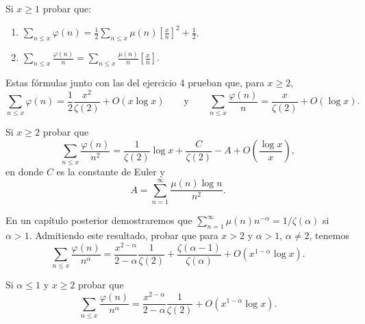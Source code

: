 \documentclass[12pt,a4paper]{book}
\begin{document}
    \begin{ejercicio}
        Si $x\geq1$ probar que:
        \begin{enumerate}
            \item[(a)] $\displaystyle\sum_{n\leq x}\varphi(n)
            =\frac{1}{2}\sum_{n\leq x}\mu(n)\left[\frac{x}{n}\right]^2+\frac{1}{2}$.
            \item[(b)] $\displaystyle\sum_{n\leq x}\frac{\varphi(n)}{n}
            =\sum_{n\leq x}\frac{\mu(n)}{n}\left[\frac{x}{n}\right]$.
        \end{enumerate}
        Estas fórmulas junto con las del ejercicio 4 prueban que, para $x\geq2$,
        \begin{equation*}
            \sum_{n\leq x}\varphi(n)=\frac{1}{2}\frac{x^2}{\zeta(2)}+O(x\log x)
            \qquad\text{y}\qquad
            \sum_{n\leq x}\frac{\varphi(n)}{n}=\frac{x}{\zeta(2)}+O(\log x).
        \end{equation*}
    \end{ejercicio}

    \begin{ejercicio}
        Si $x\geq2$ probar que
        \begin{equation*}
            \sum_{n\leq x}\frac{\varphi(n)}{n^2}=\frac{1}{\zeta(2)}\log x+\frac{C}{\zeta(2)}-A
            +O\left(\frac{\log x}{x}\right),
        \end{equation*}
        en donde $C$ es la constante de Euler y
        \begin{equation*}
            A=\sum_{n=1}^{\infty}\frac{\mu(n)\log n}{n^2}.
        \end{equation*}
    \end{ejercicio}

    \begin{ejercicio}
        En un capítulo posterior demostraremos que $\sum_{n=1}^{\infty}\mu(n)n^{-\alpha}
        =1/\zeta(\alpha)$ si $\alpha>1$. Admitiendo este resultado, probar que para $x>2$
        y $\alpha>1$, $\alpha\neq2$, tenemos
        \begin{equation*}
            \sum_{n\leq x}\frac{\varphi(n)}{n^\alpha}=\frac{x^{2-\alpha}}{2-\alpha}
            \frac{1}{\zeta(2)}+\frac{\zeta(\alpha-1)}{\zeta(\alpha)}+O(x^{1-\alpha}\log x).
        \end{equation*}
    \end{ejercicio}

    \begin{ejercicio}
        Si $\alpha\leq1$ y $x\geq2$ probar que
        \begin{equation*}
            \sum_{n\leq x}\frac{\varphi(n)}{n^\alpha}=\frac{x^{2-\alpha}}{2-\alpha}\frac{1}{\zeta(2)}
            +O(x^{1-\alpha}\log x).
        \end{equation*}
    \end{ejercicio}
\end{document}
